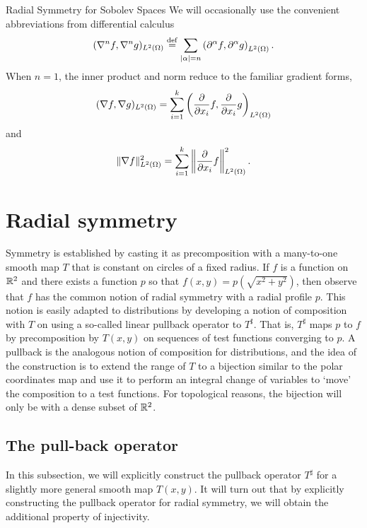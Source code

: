 \begin{chapter}{Radial Symmetry for Sobolev Spaces}
We will occasionally use the convenient abbreviations from differential calculus
\begin{equation}
  (\nabla^n f,\nabla^n g)_{L^2(\Omega)} \stackrel{\rm def}{=} \sum_{|\alpha|= n} \left(\partial^\alpha f,\partial^\alpha g\right)_{L^2(\Omega)}.
\end{equation}
When $n=1$, the inner product and norm reduce to the familiar gradient forms,
\begin{equation}
  (\nabla f,\nabla g)_{L^2(\Omega)} = \sum_{i=1}^k \left(\frac{\partial}{\partial x_i} f,\frac{\partial}{\partial x_i} g\right)_{L^2(\Omega)}
\end{equation}
and 
\begin{equation}
  \|\nabla f\|^2_{L^2(\Omega)} = \sum_{i=1}^k\left\| \frac{\partial}{\partial x_i}f\right\|^2_{L^2(\Omega)}.
\end{equation}

\section{Radial symmetry}
Symmetry is established by casting it as precomposition with a many-to-one smooth map $T$ that is constant on circles of a fixed radius.  
If $f$ is a function on $\mathbb R^2$ and there exists a function $p$ so that $f(x,y) = p(\sqrt{x^2 + y^2})$, then observe that $f$ has the common notion of radial symmetry with a radial profile $p$.
This notion is easily adapted to distributions by developing a notion of composition with $T$ on using a so-called linear pullback operator to $T^\sharp$.
That is, $T^\sharp$ maps $p$ to $f$ by precomposition by $T(x,y)$ on sequences of test functions converging to $p$.
A pullback is the analogous notion of composition for distributions, and the idea of the construction is to extend the range of $T$ to a bijection similar to the polar coordinates map and use it to perform an integral change of variables to `move' the composition to a test functions.
For topological reasons, the bijection will only be with a dense subset of $\mathbb R^2$.

\subsection{The pull-back operator}
In this subsection, we will explicitly construct the pullback operator $T^\sharp$ for a slightly more general smooth map $T(x,y)$. 
It will turn out that by explicitly constructing the pullback operator for radial symmetry, we will obtain the additional property of injectivity.


\end{chapter}
